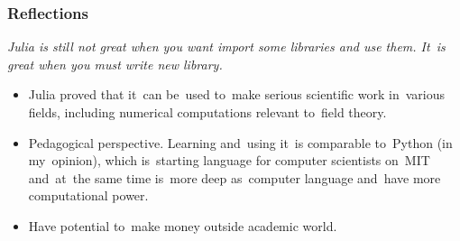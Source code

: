 \documentclass[10pt,t]{beamer}
\begin{document}
\begin{frame}
  \frametitle{Reflections}


  \textit{Julia is still not great when you want import some libraries
    and use them. It~is great when you must write new library.}




  \begin{itemize}
    \RaggedRight

  \item Julia proved that it~can be~used to~make serious scientific
    work in~various fields, including numerical computations relevant
    to~field theory.

  \item Pedagogical perspective. Learning and~using it~is comparable
    to~Python (in my~opinion), which is~starting language for computer
    scientists on~MIT and~at~the same time is~more deep as~computer
    language and~have more computational power.

  \item Have potential to~make money outside academic world.

  \end{itemize}

\end{frame}
\end{document}
